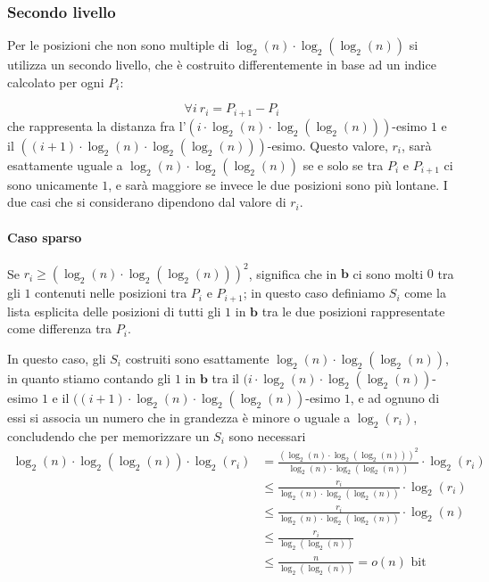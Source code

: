 \subsubsection{Secondo livello}
Per le posizioni che non sono multiple di $\log_2(n) \cdot \log_2(\log_2(n))$ si utilizza
un secondo livello, che è costruito differentemente in base ad un indice calcolato
per ogni $P_i$:

$$
	\forall i ~ r_i = P_{i + 1} - P_i
$$
che rappresenta la distanza fra l'$(i \cdot \log_2(n) \cdot \log_2(\log_2(n)))$-esimo $1$
e il $((i+1) \cdot \log_2(n) \cdot \log_2(\log_2(n)))$-esimo. Questo
valore, $r_i$, sarà esattamente uguale a $\log_2(n) \cdot \log_2(\log_2(n))$ se e solo se
tra $P_{i}$ e $P_{i+1}$ ci sono unicamente $1$, e sarà maggiore se invece le
due posizioni sono più lontane.
I due casi che si considerano dipendono dal valore di $r_i$.

\paragraph{Caso sparso}
Se $r_i \geq (\log_2(n) \cdot \log_2(\log_2(n)))^2$, significa che in $\mathbf{b}$ ci
sono molti $0$ tra gli $1$ contenuti nelle posizioni tra $P_{i}$ e $P_{i+1}$; in questo caso
definiamo $S_i$ come la lista esplicita delle posizioni di tutti gli $1$
in $\mathbf{b}$ tra le due posizioni rappresentate come differenza tra $P_i$.

In questo caso, gli $S_i$ costruiti sono esattamente $\log_2(n)\cdot \log_2(\log_2(n))$,
in quanto stiamo contando gli $1$ in $\mathbf{b}$ tra il $(i \cdot \log_2(n) \cdot \log_2(\log_2(n))$-esimo
$1$ e il $((i+1) \cdot \log_2(n) \cdot \log_2(\log_2(n))$-esimo $1$, e ad ognuno
di essi si associa un numero che in grandezza è minore o uguale a
$\log_2(r_i)$, concludendo che per memorizzare un $S_i$ sono necessari
\begin{align*}
	\log_2(n)\cdot \log_2(\log_2(n)) \cdot \log_2(r_i) & = \frac{(\log_2(n)\cdot \log_2(\log_2(n)))^2}{\log_2(n)\cdot \log_2(\log_2(n))} \cdot \log_2(r_i) \\
	                                                   & \leq \frac{r_i}{\log_2(n)\cdot \log_2(\log_2(n))} \cdot \log_2(r_i)                               \\
	                                                   & \leq \frac{r_i}{\log_2(n)\cdot \log_2(\log_2(n))} \cdot \log_2(n)                                 \\
	                                                   & \leq \frac{r_i}{\log_2(\log_2(n))}                                                                \\
	                                                   & \leq \frac{n}{\log_2(\log_2(n))}   = o(n) \text{ bit}
\end{align*}

